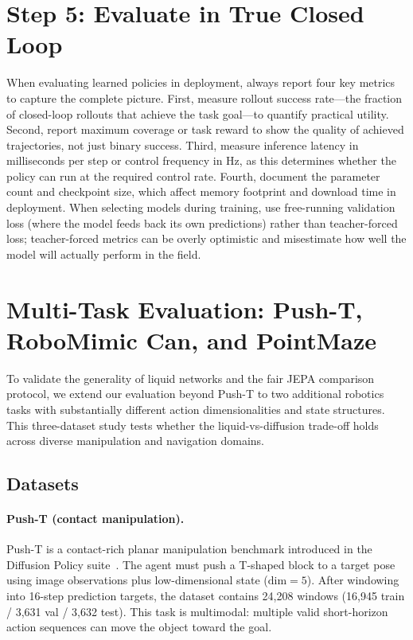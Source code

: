 \documentclass{article}
\begin{document}
\section{Step 5: Evaluate in True Closed Loop}
When evaluating learned policies in deployment, always report four key metrics to capture the complete picture. First, measure rollout success rate---the fraction of closed-loop rollouts that achieve the task goal---to quantify practical utility. Second, report maximum coverage or task reward to show the quality of achieved trajectories, not just binary success. Third, measure inference latency in milliseconds per step or control frequency in Hz, as this determines whether the policy can run at the required control rate. Fourth, document the parameter count and checkpoint size, which affect memory footprint and download time in deployment. When selecting models during training, use free-running validation loss (where the model feeds back its own predictions) rather than teacher-forced loss; teacher-forced metrics can be overly optimistic and misestimate how well the model will actually perform in the field.

\section{Multi-Task Evaluation: Push-T, RoboMimic Can, and PointMaze}

To validate the generality of liquid networks and the fair JEPA comparison protocol, we extend our evaluation beyond Push-T to two additional robotics tasks with substantially different action dimensionalities and state structures. This three-dataset study tests whether the liquid-vs-diffusion trade-off holds across diverse manipulation and navigation domains.

\subsection{Datasets}

\paragraph{Push-T (contact manipulation).}
Push-T is a contact-rich planar manipulation benchmark introduced in the Diffusion Policy suite~\cite{chi2023diffusion}. The agent must push a T-shaped block to a target pose using image observations plus low-dimensional state ($\text{dim}=5$). After windowing into 16-step prediction targets, the dataset contains 24{,}208 windows (16{,}945 train / 3{,}631 val / 3{,}632 test). This task is multimodal: multiple valid short-horizon action sequences can move the object toward the goal.
\end{document}
